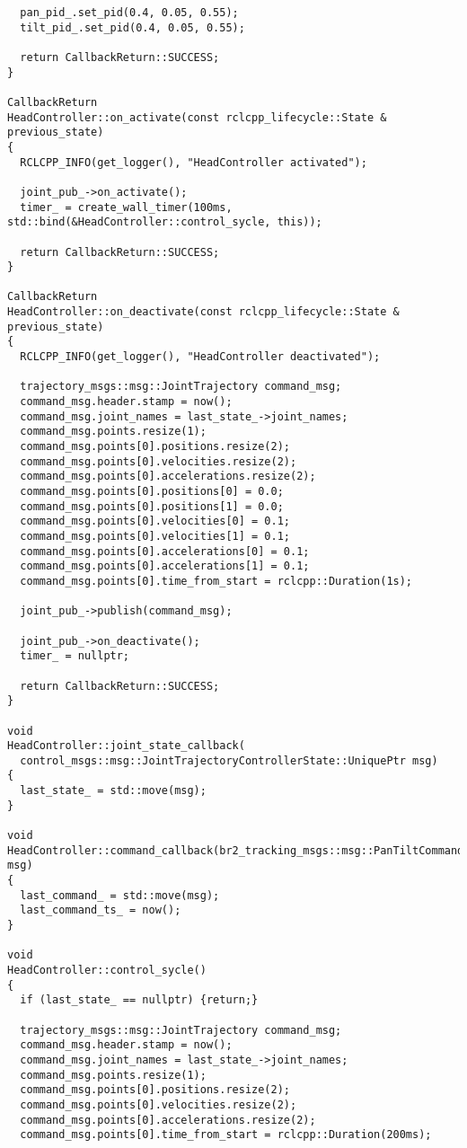 \begin{tcolorbox}[sharp corners, colframe=gray!80, colback=LightGray, left=0pt, top=0pt, bottom=0pt, title=\texttt{br2\_tracking/src/br2\_tracking/HeadController.cpp}]
\begin{verbatim}
  pan_pid_.set_pid(0.4, 0.05, 0.55);
  tilt_pid_.set_pid(0.4, 0.05, 0.55);

  return CallbackReturn::SUCCESS;
}

CallbackReturn
HeadController::on_activate(const rclcpp_lifecycle::State & previous_state)
{
  RCLCPP_INFO(get_logger(), "HeadController activated");

  joint_pub_->on_activate();
  timer_ = create_wall_timer(100ms, std::bind(&HeadController::control_sycle, this));

  return CallbackReturn::SUCCESS;
}

CallbackReturn
HeadController::on_deactivate(const rclcpp_lifecycle::State & previous_state)
{
  RCLCPP_INFO(get_logger(), "HeadController deactivated");

  trajectory_msgs::msg::JointTrajectory command_msg;
  command_msg.header.stamp = now();
  command_msg.joint_names = last_state_->joint_names;
  command_msg.points.resize(1);
  command_msg.points[0].positions.resize(2);
  command_msg.points[0].velocities.resize(2);
  command_msg.points[0].accelerations.resize(2);
  command_msg.points[0].positions[0] = 0.0;
  command_msg.points[0].positions[1] = 0.0;
  command_msg.points[0].velocities[0] = 0.1;
  command_msg.points[0].velocities[1] = 0.1;
  command_msg.points[0].accelerations[0] = 0.1;
  command_msg.points[0].accelerations[1] = 0.1;
  command_msg.points[0].time_from_start = rclcpp::Duration(1s);

  joint_pub_->publish(command_msg);

  joint_pub_->on_deactivate();
  timer_ = nullptr;

  return CallbackReturn::SUCCESS;
}

void
HeadController::joint_state_callback(
  control_msgs::msg::JointTrajectoryControllerState::UniquePtr msg)
{
  last_state_ = std::move(msg);
}

void
HeadController::command_callback(br2_tracking_msgs::msg::PanTiltCommand::UniquePtr msg)
{
  last_command_ = std::move(msg);
  last_command_ts_ = now();
}

void
HeadController::control_sycle()
{
  if (last_state_ == nullptr) {return;}

  trajectory_msgs::msg::JointTrajectory command_msg;
  command_msg.header.stamp = now();
  command_msg.joint_names = last_state_->joint_names;
  command_msg.points.resize(1);
  command_msg.points[0].positions.resize(2);
  command_msg.points[0].velocities.resize(2);
  command_msg.points[0].accelerations.resize(2);
  command_msg.points[0].time_from_start = rclcpp::Duration(200ms);


\end{verbatim}
\end{tcolorbox}
